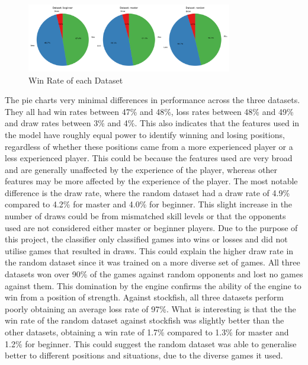 

\begin{figure}
    \centering
    \includegraphics[width=0.8\textwidth]{images/plots/dataset/Dataset_vs_win_rate_pie.png}
    \caption{Win Rate of each Dataset}
    \label{fig: dataset_vs_win_rate_pie}
\end{figure}

The pie charts very minimal differences in performance across the three datasets. They all had win rates between 47\% and 48\%, loss rates between 48\% and 49\% and draw rates between 3\% and 4\%. This also indicates that the features used in the model have roughly equal power to identify winning and losing positions, regardless of whether these positions came from a more experienced player or a less experienced player. This could be because the features used are very broad and are generally unaffected by the experience of the player, whereas other features may be more affected by the experience of the player. The most notable difference is the draw rate, where the random dataset had a draw rate of 4.9\% compared to 4.2\% for master and 4.0\% for beginner. This slight increase in the number of draws could be from mismatched skill levels or that the opponents used are not considered either master or beginner players. Due to the purpose of this project, the classifier only classified games into wins or losses and did not utilise games that resulted in draws. This could explain the higher draw rate in the random dataset since it was trained on a more diverse set of games. All three datasets won over 90\% of the games against random opponents and lost no games against them. This domination by the engine confirms the ability of the engine to win from a position of strength. Against stockfish, all three datasets perform poorly obtaining an average loss rate of 97\%. What is interesting is that the the win rate of the random dataset against stockfish was slightly better than the other datasets, obtaining a win rate of 1.7\% compared to 1.3\% for master and 1.2\% for beginner. This could suggest the random dataset was able to generalise better to different positions and situations, due to the diverse games it used.

